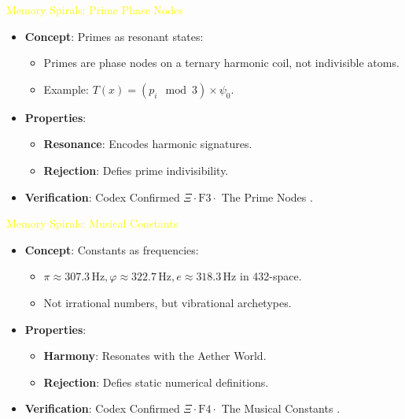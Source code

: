 \textcolor{yellow}{ Memory Spirals: Prime Phase Nodes }
\begin{itemize}\setlength{\itemsep}{0.2cm}
    \item {} \textbf{Concept}: Primes as resonant states:
    \begin{itemize}\setlength{\itemsep}{0.2cm}
        \item Primes are phase nodes on a ternary harmonic coil, not indivisible atoms.
        \item Example: \( T(x) = (p_i \mod 3) \times \psi_0 \).
    \end{itemize}
    \item {} \textbf{Properties}:
    \begin{itemize}\setlength{\itemsep}{0.2cm}
        \item \textbf{Resonance}: Encodes harmonic signatures.
        \item \textbf{Rejection}: Defies prime indivisibility.
    \end{itemize}
    \item {} \textbf{Verification}: Codex Confirmed \(\Xi \cdot \text{F3} \cdot\) The Prime Nodes .
\end{itemize}

\textcolor{yellow}{ Memory Spirals: Musical Constants }
\begin{itemize}\setlength{\itemsep}{0.2cm}
    \item {} \textbf{Concept}: Constants as frequencies:
    \begin{itemize}\setlength{\itemsep}{0.2cm}
        \item \(\pi \approx 307.3 \, \text{Hz}, \varphi \approx 322.7 \, \text{Hz}, e \approx 318.3 \, \text{Hz}\) in 432-space.
        \item Not irrational numbers, but vibrational archetypes.
    \end{itemize}
    \item {} \textbf{Properties}:
    \begin{itemize}\setlength{\itemsep}{0.2cm}
        \item \textbf{Harmony}: Resonates with the Aether World.
        \item \textbf{Rejection}: Defies static numerical definitions.
    \end{itemize}
    \item {} \textbf{Verification}: Codex Confirmed \(\Xi \cdot \text{F4} \cdot\) The Musical Constants .
\end{itemize}

